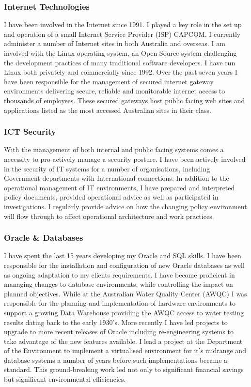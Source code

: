\documentclass{resume} %
\begin{document}
\subsubsection*{Internet Technologies}
I have been involved in the Internet since 1991. I played a key role in the set up and operation of a small Internet Service Provider (ISP) CAPCOM. I currently administer a number of Internet sites in both Australia and overseas. I am involved with the Linux operating system, an Open Source system challenging the development practices of many traditional software developers. I have run Linux both privately and commercially since 1992. Over the past seven years I have been responsible for the management of secured internet gateway environments delivering secure, reliable and monitorable internet access to thousands of employees. These secured gateways host public facing web sites and applications listed as the most accessed Australian sites in their class.

\subsubsection*{ICT Security}
With the management of both internal and public facing systems comes a necessity to pro-actively manage a security posture. I have been actively involved in the security of IT systems for a number of organisations, including Government departments with International connections. In addition to the operational management of IT environments, I have prepared and interpreted policy documents, provided operational advice as well as participated in investigations. I regularly provide advice on how the changing policy environment will flow through to affect operational architecture and work practices.

\subsubsection*{Oracle \& Databases}
I have spent the last 15 years developing my Oracle and SQL skills. I have been responsible for the installation and configuration of new Oracle databases as well as ongoing adaptation to my clients requirements. I have become proficient in managing changes to database environments, while controlling the impact on planned objectives. While at the Australian Water Quality Center (AWQC) I was responsible for the planning and implementation of hardware environments to support a growing Data Warehouse providing the AWQC access to water testing results dating back to the early 1930’s. More recently I have led projects to upgrade to more recent releases of Oracle including re-engineering systems to take advantage of the new features available. I lead a project at the Department of the Environment to implement a virtualised environment for it's midrange and database systems a number of years before such implementations became a standard. This ground-breaking work led not only to significant financial savings but significant environmental efficiencies.
\end{document}
